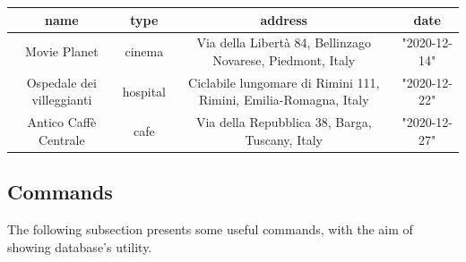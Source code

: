 \documentclass{article}[IEEEtran]
\begin{document}
\begin{itemize}
    \begin{table}[H]
    \hspace{-1cm}
    \begin{tabular}{|c|c|c|c|}
    \hline
    \textbf{name}             & \textbf{type} & \textbf{address}                                                 & \textbf{date} \\ \hline
    Movie Planet              & cinema        & Via della Libertà 84, Bellinzago Novarese, Piedmont, Italy       & "2020-12-14"  \\ \hline
    Ospedale dei villeggianti & hospital      & Ciclabile lungomare di Rimini 111, Rimini, Emilia-Romagna, Italy & "2020-12-22"  \\ \hline
    Antico Caffè Centrale     & cafe          & Via della Repubblica 38, Barga, Tuscany, Italy                   & "2020-12-27"  \\ \hline
    \end{tabular}
    \end{table}    

\end{itemize}

\subsection{Commands}

The following subsection presents some useful commands, with the aim of showing database’s utility.
\end{document}
